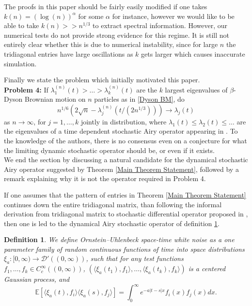 \documentclass{amsart}
\newtheorem{defn}[thm]{Definition}
\numberwithin{equation}{section}
\newcommand{\E}{\mathbb{E}}
\newcommand{\la}{\langle}
\newcommand{\ra}{\rangle}
\begin{document}
The proofs in this paper should be fairly easily modified if one takes $k(n)=(\log(n))^{\alpha}$ for some $\alpha$ for instance, however we would like to be able to take $k(n)>>n^{1/3}$ to extract spectral information. However, our numerical tests do not provide strong evidence for this regime. It is still not entirely clear whether this is due to numerical instability, since for large $n$ the tridiagonal entries have large oscillations as $k$ gets larger which causes inaccurate simulation.

Finally we state the problem which initially motivated this paper.\\

\noindent \textbf{Problem 4:} If $\lambda_1^{(n)}(t)>\dots>\lambda_k^{(n)}(t)$ are the $k$ largest eigenvalues of $\beta$-Dyson Brownian motion on $n$ particles as in \eqref{Dyson BM}, do
\begin{equation*}
    n^{1/6}(2\sqrt{n}-\lambda_j^{(n)}(t/(2n^{1/3}))) \to \lambda_j(t)
\end{equation*}
as $n \to \infty$, for $j=1,\dots,k$ jointly in distribution, where $\lambda_1(t)\leq \lambda_2(t) \leq \dots$ are the eigenvalues of a time dependent stochastic Airy operator appearing in \cite{ramirez2011beta}. To the knowledge of the authors, there is no consensus even on a conjecture for what the limiting dynamic stochastic operator should be, or even if it exists.\\

We end the section by discussing a natural candidate for the dynamical stochastic Airy operator suggested by Theorem \ref{Main Theorem Statement}, followed by a remark explaining why it is not the operator required in Problem 4.

If one assumes that the pattern of entries in Theorem \ref{Main Theorem Statement} continues down the entire tridiagonal matrix, than following the informal derivation from tridiagonal matrix to stochastic differential operator proposed in \cite{EdSu07}, then one is led to the dynamical Airy stochastic operator of definition \ref{def:stochastic-airy-op}. 

\begin{defn}\label{def:stochastic-airy-op}
    We define \textit{Ornstein--Uhlenbeck space-time white noise} as a one parameter family of random continuous functions of time into space distributions $\xi_{a}:[0,\infty)\to \mathcal{D}'((0,\infty))$, such that for any test functions $f_1,\dots,f_k \in C_c^{\infty}((0,\infty))$, $(\la \xi_{a}(t_1),f_1 \ra,\dots,\la \xi_{a}(t_k), f_k \ra)$ is a centered Gaussian process, and
    \begin{equation}
        \E[\la \xi_{a}(t), f_i\ra \la \xi_{a}(s), f_j\ra] = \int_{0}^{\infty} e^{-a|t-s|x} f_i(x)f_j(x) dx.
    \end{equation}
\end{defn}
\end{document}
